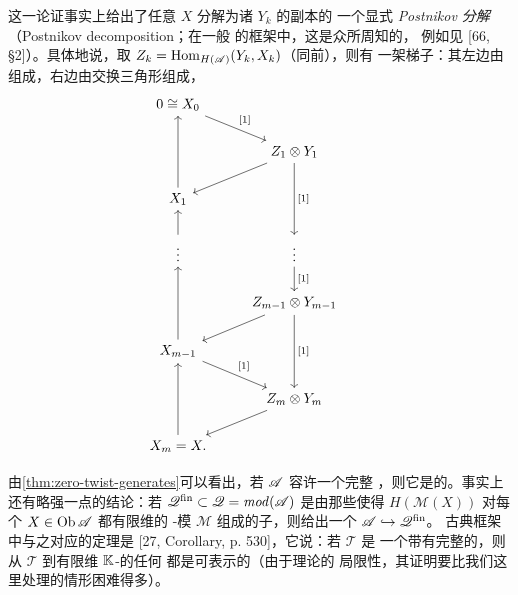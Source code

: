 这一论证事实上给出了任意\trObject{} $X$ 分解为诸 $Y_k$ 的\trSuspension{}副本的
一个显式 \emph{Postnikov 分解}（Postnikov decomposition；在一般%
\trTriangulated{}\trCategory{}的\trExceptionalCollection{}框架中，这是众所周知的，
例如见 [66, §2]）。具体地说，取 $Z_k=\operatorname{Hom}_{H(\mathscr{A})}(Y_k,X_k)$（同前），则有
一架梯子：其左边由\trExactTriangle{}组成，右边由交换三角形组成，
\begin{equation}\label{eq:postnikov-ladder}
\begin{tikzcd}
0\cong X_0 \ar[dr,"{[1]}"] & & \\
 & Z_1\otimes Y_1 \ar[dl] \ar[dd,"{[1]}"] & \\
X_1 \ar[uu] & & \\
\vdots \ar[u] & \vdots \ar[d,"{[1]}"] & \\
 & Z_{m-1}\otimes Y_{m-1} \ar[dl] \ar[dd,"{[1]}"] & \\
X_{m-1} \ar[uu] \ar[dr,"{[1]}"] & & \\
 & Z_m\otimes Y_m \ar[dl] & \\
X_m=X. \ar[uu] & &
\end{tikzcd}
\end{equation}

\begin{remark}\label{thm:full-collection-split-closed}
由\cref{thm:zero-twist-generates}可以看出，若 $\mathscr{A}$ 容许一个完整%
\trExceptionalCollection，则它是\trSplitClosed{}的。事实上还有略强一点的结论：若
$\mathscr{Q}^{\mathrm{fin}}\subset\mathscr{Q}=\mathit{mod}(\mathscr{A})$ 是由那些使得
$H(\mathscr{M}(X))$ 对每个 $X\in\operatorname{Ob}\mathscr{A}$ 都有限维的 \trAinfty-模
$\mathscr{M}$ 组成的\trFull{}子\trCategory，则\trYonedaEmbedding{}给出一个%
\trQuasiequivalence{} $\mathscr{A}\hookrightarrow\mathscr{Q}^{\mathrm{fin}}$。
古典框架中与之对应的定理是 [27, Corollary, p. 530]，它说：若 $\mathscr{T}$ 是
一个带有完整\trExceptionalCollection{}的\trTriangulated{}\trCategory，则从
$\mathscr{T}$ 到有限维 $\mathbb{K}$-\trVectorSpace{}\trCategory{}的任何%
\trCohomology\trFunctor{}都是可表示的（由于\trTriangulated{}\trCategory{}理论的
局限性，其证明要比我们这里处理的情形困难得多）。
\end{remark}
